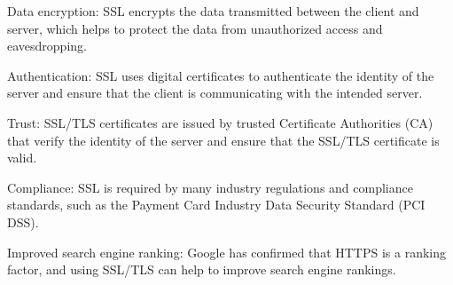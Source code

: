 \documentclass[11pt]{article}
\begin{document}
\begin{enumerate}
Data encryption: SSL encrypts the data transmitted between the client and server, which helps to protect the data from unauthorized access and eavesdropping.

Authentication: SSL uses digital certificates to authenticate the identity of the server and ensure that the client is communicating with the intended server.

Trust: SSL/TLS certificates are issued by trusted Certificate Authorities (CA) that verify the identity of the server and ensure that the SSL/TLS certificate is valid.

Compliance: SSL is required by many industry regulations and compliance standards, such as the Payment Card Industry Data Security Standard (PCI DSS).

Improved search engine ranking: Google has confirmed that HTTPS is a ranking factor, and using SSL/TLS can help to improve search engine rankings.
\end{enumerate}
\end{document}
